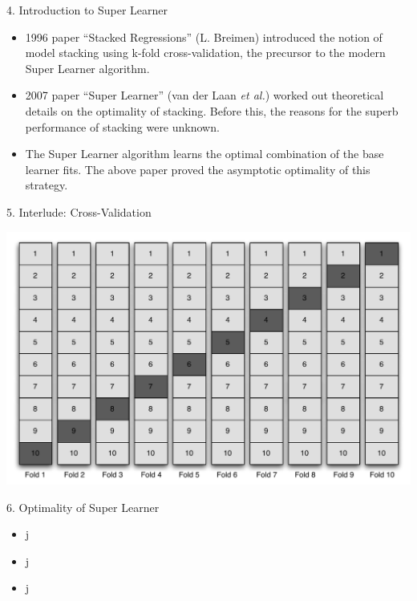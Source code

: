 \documentclass[12pt,t]{beamer}
\begin{document}
\begin{frame}[c]{4. Introduction to Super Learner}

\vspace*{3mm}

\centering

  \begin{itemize}
    \itemsep12pt
    \item 1996 paper ``Stacked Regressions'' (L. Breimen) introduced the notion
          of model stacking using k-fold cross-validation, the precursor to the
          modern Super Learner algorithm.
    \item 2007 paper ``Super Learner'' (van der Laan \textit{et al.}) worked out
          theoretical details on the optimality of stacking. Before this, the
          reasons for the superb performance of stacking were unknown.
    \item The Super Learner algorithm learns the optimal combination of the
          base learner fits. The above paper proved the asymptotic optimality
          of this strategy.
  \end{itemize}

\note{
}
\end{frame}


\begin{frame}[c]{5. Interlude: Cross-Validation}

\vspace*{3mm}

\centering

\includegraphics[scale=0.45]{Figs/cv.pdf}

\note{
}
\end{frame}


\begin{frame}[c]{6. Optimality of Super Learner}

\vspace*{3mm}

\centering

  \begin{itemize}
    \itemsep12pt
    \item j
    \item j
    \item j
  \end{itemize}

\note{
}
\end{frame}
\end{document}
